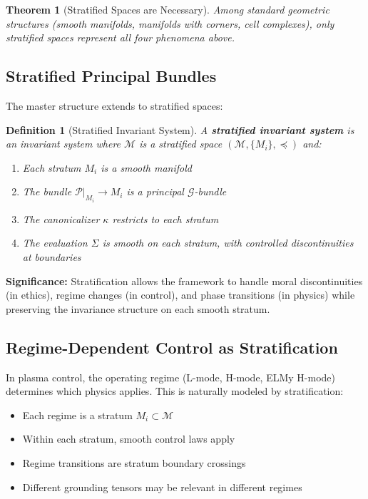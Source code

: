 \documentclass[12pt]{article}
\newtheorem{theorem}{Theorem}[section]
\newtheorem{definition}{Definition}[section]
\begin{document}
\begin{theorem}[Stratified Spaces are Necessary]
\textit{Among standard geometric structures (smooth manifolds, manifolds with corners, cell complexes), only stratified spaces represent all four phenomena above.}
\end{theorem}

\subsection{Stratified Principal Bundles}

The master structure extends to stratified spaces:

\begin{definition}[Stratified Invariant System]
A \textbf{stratified invariant system} is an invariant system where $\mathcal{M}$ is a stratified space $(\mathcal{M}, \{M_i\}, \preceq)$ and:
\begin{enumerate}
    \item Each stratum $M_i$ is a smooth manifold
    \item The bundle $\mathcal{P}|_{M_i} \to M_i$ is a principal $\mathcal{G}$-bundle
    \item The canonicalizer $\kappa$ restricts to each stratum
    \item The evaluation $\Sigma$ is smooth on each stratum, with controlled discontinuities at boundaries
\end{enumerate}
\end{definition}

\textbf{Significance:} Stratification allows the framework to handle moral discontinuities (in ethics), regime changes (in control), and phase transitions (in physics) while preserving the invariance structure on each smooth stratum.

\subsection{Regime-Dependent Control as Stratification}

In plasma control, the operating regime (L-mode, H-mode, ELMy H-mode) determines which physics applies. This is naturally modeled by stratification:

\begin{itemize}
    \item Each regime is a stratum $M_i \subset \mathcal{M}$
    \item Within each stratum, smooth control laws apply
    \item Regime transitions are stratum boundary crossings
    \item Different grounding tensors may be relevant in different regimes
\end{itemize}
\end{document}
